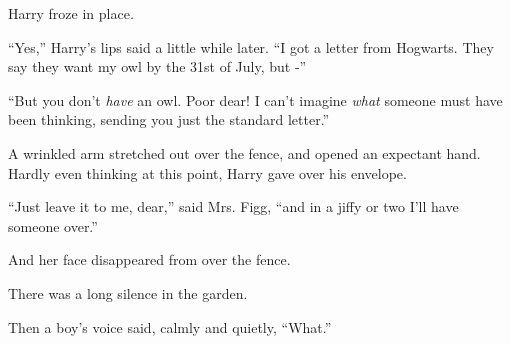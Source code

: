 Harry froze in place\emph{.}

``Yes,'' Harry's lips said a little while later. ``I got a letter from
Hogwarts. They say they want my owl by the 31st of July, but -''

``But you don't \emph{have} an owl. Poor dear! I can't imagine
\emph{what} someone must have been thinking, sending you just the
standard letter.''

A wrinkled arm stretched out over the fence, and opened an expectant
hand. Hardly even thinking at this point, Harry gave over his envelope.

``Just leave it to me, dear,'' said Mrs. Figg, ``and in a jiffy or two
I'll have someone over.''

And her face disappeared from over the fence.

There was a long silence in the garden.

Then a boy's voice said, calmly and quietly, ``What.''
